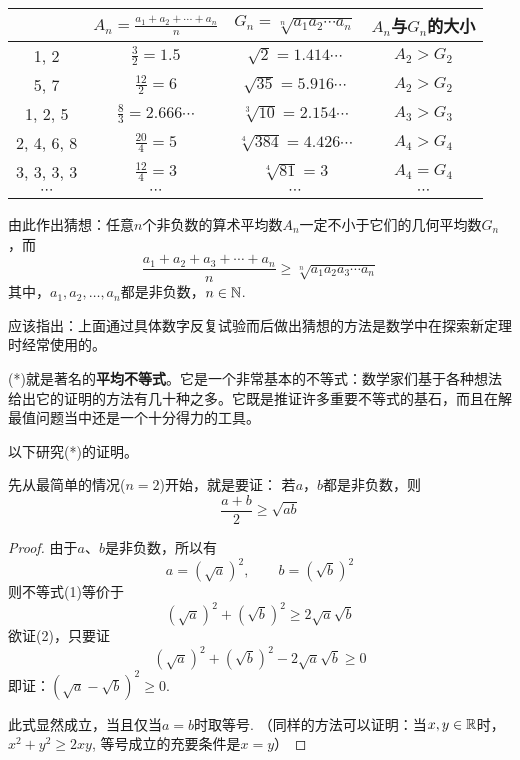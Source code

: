 \begin{center}
\begin{tabular}{cccc}
    \hline  
&  $A_n=\frac{a_1+a_2+\cdots+a_n}{n}$ & $G_n=\sqrt[n]{a_1a_2\cdots a_n}$ & $A_n$与$G_n$的大小 \\[2ex]
\hline
1, 2&  $\frac{3}{2}=1.5$ & $\sqrt{2}=1.414\cdots$ &$A_2>G_2$\\[2ex]
5, 7&  $\frac{12}{2}=6$ & $\sqrt{35}=5.916\cdots$ &$A_2>G_2$\\[2ex]
1, 2, 5& $\frac{8}{3}=2.666\cdots$ & $\sqrt[3]{10}=2.154\cdots$ &$A_3>G_3$\\[2ex]
2, 4, 6, 8& $\frac{20}{4}=5$ & $\sqrt[4]{384}=4.426\cdots$ &$A_4>G_4$\\[2ex]
3, 3, 3, 3& $\frac{12}{4}=3$ & $\sqrt[4]{81}=3$ &$A_4=G_4$\\[2ex]
$\cdots$ & $\cdots$ & $\cdots$ & $\cdots$\\
\hline
\end{tabular}
\end{center}

由此作出猜想：任意$n$个非负数的算术平均数$A_n$一定不小于它们的几何平均数$G_n$，而
\begin{equation}
    \frac{a_1+a_2+a_3+\cdots+a_n}{n}\ge \sqrt[n]{a_1a_2a_3\cdots a_n}\tag{*}
\end{equation}
其中，$a_1,a_2,\ldots,a_n$都是非负数，$n\in\mathbb{N}$.

应该指出：上面通过具体数字反复试验而后做出猜想的方法是数学中在探索新定理时经常使用的。

(*)就是著名的\textbf{平均不等式}。它是一个非常基本的不等式：数学家们基于各种想法给出它的证明的方法有几十种之多。它既是推证许多重要不等式的基石，而且在解最值问题当中还是一个十分得力的工具。

以下研究(*)的证明。

先从最简单的情况($n=2$)开始，就是要证：
若$a$，$b$都是非负数，则
\begin{equation}
    \frac{a+b}{2}\ge \sqrt{ab}\tag{1}
\end{equation}

\begin{proof}
由于$a$、$b$是非负数，所以有
\[a=(\sqrt{a})^2,\qquad b=(\sqrt{b})^2\]
则不等式(1)等价于
\begin{equation}
    (\sqrt{a})^2+(\sqrt{b})^2\ge 2\sqrt{a}\sqrt{b}\tag{2}
\end{equation}
欲证(2)，只要证
\[    (\sqrt{a})^2+(\sqrt{b})^2- 2\sqrt{a}\sqrt{b}\ge 0\]
即证：$(\sqrt{a}-\sqrt{b})^2\ge 0$.

此式显然成立，当且仅当$a=b$时取等号. 
（同样的方法可以证明：当$x,y\in\mathbb{R}$时，$x^2+y^2\ge 2xy$, 等号成立的充要条件是$x=y$）
\end{proof}

